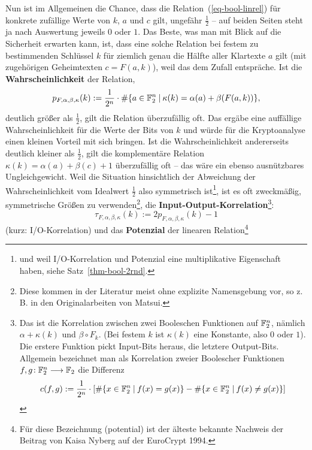 \begin{refsegment}
Nun ist im Allgemeinen die Chance, dass die Relation~(\ref{eq-bool-linrel})
für konkrete zufällige Werte von $k$, $a$ und $c$ gilt, ungefähr
$\frac{1}{2}$ -- auf beiden Seiten steht ja nach Auswertung jeweils
$0$ oder $1$. Das Beste, was man mit Blick auf die Sicherheit
erwarten kann, ist, dass eine solche Relation bei festem zu
bestimmenden Schlüssel $k$ für ziemlich genau die Hälfte aller
Klartexte $a$ gilt (mit zugehörigen Geheimtexten $c = F(a,k)$),
weil das dem Zufall entspräche. Ist die {\bf Wahrscheinlichkeit}
der Relation,
\[
   p_{F,\alpha,\beta,\kappa}(k) := \frac{1}{2^n} \cdot
      \#\{a \in \mathbb{F}_2^n \:|\:
           \kappa(k) = \alpha(a) + \beta(F(a,k)) \},
\]
deutlich größer als $\frac{1}{2}$, gilt die Relation überzufällig oft.
Das ergäbe eine auffällige Wahrscheinlichkeit für die Werte der
Bits von $k$ und würde für die Kryptoanalyse einen kleinen Vorteil
mit sich bringen. Ist die Wahrscheinlichkeit andererseits deutlich
kleiner als $\frac{1}{2}$, gilt die komplementäre Relation
$\kappa(k) = \alpha(a) + \beta(c) + 1$ überzufällig oft -- das wäre
ein ebenso ausnützbares Ungleichgewicht.
Weil die Situation hinsichtlich der Abweichung der Wahrscheinlichkeit
vom Idealwert $\frac{1}{2}$ also symmetrisch ist\footnote{%
   und weil I/O-Korrelation und
   Potenzial eine multiplikative Eigenschaft haben,
   siehe Satz~\ref{thm-bool-2rnd}.
}, ist es oft zweckmäßig, symmetrische Größen zu verwenden\footnote{%
   Diese kommen in der Literatur meist ohne explizite Namensgebung vor,
   so z.\,B. in den Originalarbeiten von Matsui.
},
die {\bf Input-Output-Korrelation}\footnote{%
   Das ist die Korrelation zwischen zwei Booleschen Funktionen auf
   $\mathbb{F}_2^n$, nämlich $\alpha + \kappa(k)$ und $\beta \circ F_k$.
   (Bei festem $k$ ist $\kappa(k)$ eine Konstante, also $0$ oder $1$).
   Die erstere Funktion pickt Input-Bits heraus, die letztere Output-Bits.
   Allgemein bezeichnet man als Korrelation zweier Boolescher Funktionen
   $f, g\!:\mathbb{F}_2^n \longrightarrow \mathbb{F}_2$ die Differenz
\[
     c(f,g) := \frac{1}{2^n} \cdot \left[ \#\{x \in \mathbb{F}_2^n \:|\: f(x) = g(x)\}
                          - \#\{x \in \mathbb{F}_2^n \:|\: f(x) \neq g(x)\} \right]
\]
}:
\[
   \tau_{F,\alpha,\beta,\kappa}(k) := 2 p_{F,\alpha,\beta,\kappa}(k) - 1
\]
(kurz: I/O-Korrelation) und das
{\bf Potenzial}
der linearen Relation\footnote{%
   Für diese Bezeichnung (\glqq potential\grqq) ist der älteste bekannte
   Nachweis der Beitrag von Kaisa Nyberg auf der {\sc EuroCrypt} 1994.
}
\end{refsegment}
